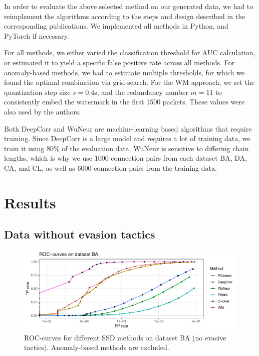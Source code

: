 \documentclass[runningheads,11pt]{llncs}\usepackage[]{graphicx}\usepackage[]{color}
\makeatletter
\def\maxwidth{ %
  \ifdim\Gin@nat@width>\linewidth
    \linewidth
  \else
    \Gin@nat@width
  \fi
}
\newenvironment{knitrout}{}{} %
\makeatother
\begin{document}
In order to evaluate the above selected method on our generated data, we had to reimplement the algorithms according to the steps and design described in the corresponding publications. We implemented all methods in Python, and PyTorch if necessary. %

For all methods, we either varied the classification threshold for AUC calculation, or estimated it to yield a specific false positive rate across all methods. For anomaly-based methods, we had to estimate multiple thresholds, for which we found the optimal combination via grid-search. %
For the WM approach, we set the quantization step size $s=0.4$s, and the redundancy number $m=11$ to consistently embed the watermark in the first 1500 packets. These values were also used by the authors.

Both DeepCorr and WuNeur are machine-learning based algorithms that require training. Since DeepCorr is a large model and requires a lot of training data, we train it using $80$\% of the evaluation data. WuNeur is sensitive to differing chain lengths, which is why we use 1000 connection pairs from each dataset BA, DA, CA, and CL, as well as 6000 connection pairs from the training data. %



\section{Results}\label{Sec:Results}


\subsection{Data without evasion tactics}

\begin{knitrout}
\color{fgcolor}\begin{figure}
\includegraphics[width=\maxwidth]{figure/Noevasion_4nodes-1} \caption[ROC-curves for different SSD methods on dataset BA (no evasive tactics)]{ROC-curves for different SSD methods on dataset BA (no evasive tactics). Anomaly-based methods are excluded.}\label{fig:Noevasion_4nodes}
\end{figure}


\end{knitrout}
\end{document}

